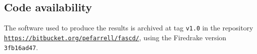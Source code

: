 \documentclass[review,hidelinks,onefignum,onetabnum]{siamart220329}
\begin{document}
\subsection*{Code availability} \label{sec:code}  The software used to produce the results is archived at tag \texttt{v1.0} in the repository \texttt{\url{https://bitbucket.org/pefarrell/fascd/}}, using the Firedrake version \texttt{3fb16ad47}.




\end{document}
